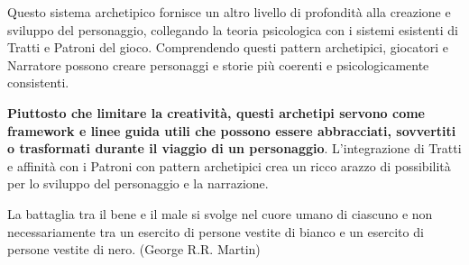 \begin{multicols}{2}
\begin{narratore}
Questo sistema archetipico fornisce un altro livello di profondità alla creazione e sviluppo del personaggio, collegando la teoria psicologica con i sistemi esistenti di Tratti e Patroni del gioco. Comprendendo questi pattern archetipici, giocatori e Narratore possono creare personaggi e storie più coerenti e psicologicamente consistenti.

\textbf{Piuttosto che limitare la creatività, questi archetipi servono come framework e linee guida utili che possono essere abbracciati, sovvertiti o trasformati durante il viaggio di un personaggio}. L'integrazione di Tratti e affinità con i Patroni con pattern archetipici crea un ricco arazzo di possibilità per lo sviluppo del personaggio e la narrazione.
\end{narratore}

\end{multicols}

\vfill

\begin{enfasi}
	La battaglia tra il bene e il male si svolge nel cuore umano di ciascuno e non necessariamente tra un esercito di persone vestite di bianco e un esercito di persone vestite di nero. (George R.R. Martin)
\end{enfasi}

\pagebreak

